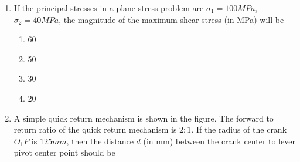 \documentclass[journal]{IEEEtran}
\begin{document}
\begin{enumerate}
    \begin{center}
    \end{center}

    \begin{multicols}{4}
    \begin{enumerate}
        \item 176.2
        \item 196.0
        \item 481.0
        \item 981.0
    \end{enumerate}
    \end{multicols}

    \item If the principal stresses in a plane stress problem are $\sigma_1 = 100 MPa$,
    $\sigma_2 = 40 MPa$, the magnitude of the maximum shear stress (in MPa) will be
    \begin{multicols}{4}
    \begin{enumerate}
        \item 60
        \item 50
        \item 30
        \item 20
    \end{enumerate}
    \end{multicols}

    \item A simple quick return mechanism is shown in the figure. The forward to return
    ratio of the quick return mechanism is $2:1$. If the radius of the crank $O_1P$ is
    $125 mm$, then the distance $d$ (in mm) between the crank center to lever pivot center
    point should be

    \begin{center}    
\end{center}
\end{enumerate}
\end{document}
